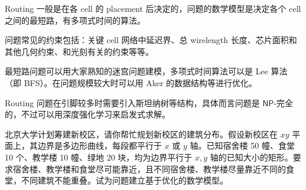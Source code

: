\begin{problems}
\begin{choices}
            \item Routing 一般是在各 cell 的 placement 后决定的，问题的数学模型是决定各个 cell 之间的最短路，有多项式时间的算法。
            \item 问题常见的约束包括：关键 cell 网络中延迟界、总 wirelength 长度、芯片面积和其他几何约束、和光刻有关的约束等等。
            \item 最短路问题可以用大家熟知的迷宫问题建模，多项式时间算法可以是 Lee 算法（即 BFS）。在问题规模较大时可以用 Aker 的数据结构等进行优化。
            \item Routing 问题在引脚较多时需要引入斯坦纳树等结构，具体而言问题是 $\mathsf{NP}$-完全的，不过可以用深度强化学习来启发式求解。
        \end{choices}
        \pro 北京大学计划筹建新校区，请你帮忙规划新校区的建筑分布。假设新校区在 $xy$ 平面上，其边界是多边形曲线，每段都平行于 $x$ 或 $y$ 轴。已知宿舍楼 50 幢、食堂 10 个、教学楼 10 幢、绿地 20 块，均为边界平行于 $x, y$ 轴的已知大小的矩形。要求宿舍楼、教学楼和食堂尽可能靠近，且不同宿舍楼、教学楼尽量靠近不同的食堂，不同建筑不能重叠。试为问题建立基于优化的数学模型。
    \end{problems}
